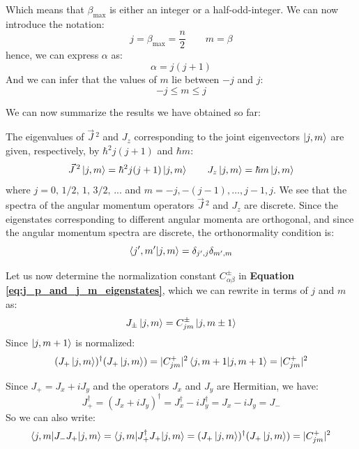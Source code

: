 Which means that $\beta_\text{max}$ is either an integer or a half-odd-integer. We can now introduce the notation:
\begin{equation}
    j = \beta_\text{max} = \frac{n}{2}\qquad m = \beta
\end{equation}
hence, we can express $\alpha$ as:
\begin{equation}
    \alpha = j(j+1)
\end{equation}
And we can infer that the values of $m$ lie between $-j$ and $j$:
\begin{equation}
    -j \leq m \leq j
\end{equation}

We can now summarize the results we have obtained so far:
\begin{definition}
    The eigenvalues of $\vec{J}\,^2$ and $J_z$ corresponding to the joint eigenvectors $\ket{j,m}$ are given, respectively, by $\hbar^2j(j+1)$ and $\hbar m$:
    \begin{equation}
        \vec{J}\,^2\ket{j,m} = \hbar^2j(j+1)\ket{j,m}\qquad J_z\ket{j,m} = \hbar m\ket{j,m}
    \end{equation}
    where $j = 0,\, 1/2,\, 1,\, 3/2,\, ...$ and $m = -j, -(j-1), \dots, j-1, j$. We see that the spectra of the angular momentum operators $\vec{J}\,^2$ and $J_z$ are discrete. Since the eigenstates corresponding to different angular momenta are orthogonal, and since the angular momentum spectra are discrete, the orthonormality condition is:
    \begin{equation}
        \braket{j',m'|j,m} = \delta_{j',j}\delta_{m',m}
    \end{equation}
\end{definition}

Let us now determine the normalization constant $C_{\alpha\beta}^\pm$ in \textbf{Equation \ref{eq:j_p_and_j_m_eigenstates}}, which we can rewrite in terms of $j$ and $m$ as:
\begin{equation}
    J_\pm\ket{j,m} = C_{jm}^\pm\ket{j,m\pm 1}
\end{equation}
Since $\ket{j,m+1}$ is normalized:
\begin{equation}
    (J_+\ket{j,m})^\dagger (J_+\ket{j,m}) = |C_{jm}^+|^2\braket{j, m+1|j, m+1} = |C_{jm}^+|^2
\end{equation}

Since $J_+ = J_x + iJ_y$ and the operators $J_x$ and $J_y$ are Hermitian, we have:
\begin{equation}
    J_+^\dagger = (J_x+iJ_y)^\dagger = J_x^\dagger -iJ_y^\dagger = J_x - iJ_y = J_-
\end{equation}
So we can also write:
\begin{equation}
    \braket{j,m|J_-J_+|j,m} = \braket{j,m|J_+^\dagger J_+|j,m} = (J_+\ket{j,m})^\dagger (J_+\ket{j,m}) = |C_{jm}^+|^2
\end{equation}

